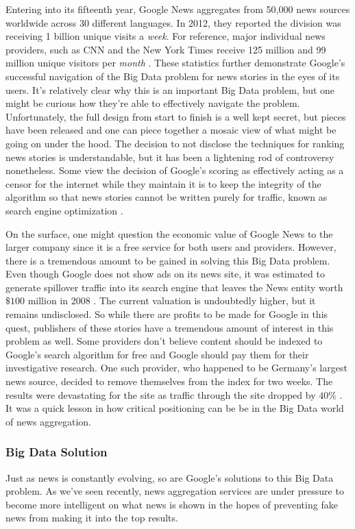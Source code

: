 \documentclass[sigconf]{acmart}
\begin{document}
Entering into its fifteenth year, Google News aggregates from 50,000 news sources worldwide across 30 different languages. In 2012, they reported the division was receiving 1 billion unique visits a \emph{week}\cite{krishna}. For reference, major individual news providers, such as CNN and the New York Times receive 125 million and 99 million unique visitors per \emph{month} \cite{nytimes}. These statistics further demonstrate Google's successful navigation of the Big Data problem for news stories in the eyes of its users. 
It's relatively clear why this is an important Big Data problem, but one might be curious how they're able to effectively navigate the problem. Unfortunately, the full design from start to finish is a well kept secret, but pieces have been released and one can piece together a mosaic view of what might be going on under the hood. The decision to not disclose the techniques for ranking news stories is understandable, but it has been a lightening rod of controversy nonetheless. Some view the decision of Google's scoring as effectively acting as a censor for the internet while they maintain it is to keep the integrity of the algorithm so that news stories cannot be written purely for traffic, known as search engine optimization \cite{censor}. 

On the surface, one might question the economic value of Google News to the larger company since it is a free service for both users and providers. However, there is a tremendous amount to be gained in solving this Big Data problem. Even though Google does not show ads on its news site, it was estimated to generate spillover traffic into its search engine that leaves the News entity worth $\$100$ million in 2008 \cite{newsvalue}. The current valuation is undoubtedly higher, but it remains undisclosed. So while there are profits to be made for Google in this quest, publishers of these stories have a tremendous amount of interest in this problem as well. Some providers don't believe content should be indexed to Google's search algorithm for free and Google should pay them for their investigative research. One such provider, who happened to be Germany's largest news source, decided to remove themselves from the index for two weeks. The results were devastating for the site as traffic through the site dropped by $40\%$ \cite{springer}. It was a quick lesson in how critical positioning can be be in the Big Data world of news aggregation.

\subsubsection{Big Data Solution}
Just as news is constantly evolving, so are Google's solutions to this Big Data problem. As we've seen recently, news aggregation services are under pressure to become more intelligent on what news is shown in the hopes of preventing fake news from making it into the top results. 
\end{document}
